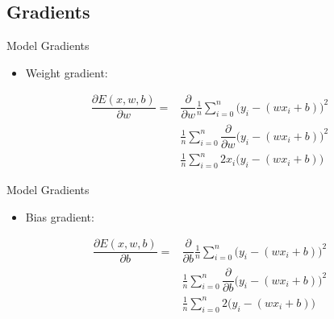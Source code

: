 \documentclass[xcolor=x11names,compress]{beamer}
\renewcommand{\(}{\begin{columns}}
\renewcommand{\)}{\end{columns}}
\newcommand{\<}[1]{\begin{column}{#1}}
\renewcommand{\>}{\end{column}}
\begin{document}
\subsection{Gradients}
\begin{frame}{Model Gradients}
	\begin{itemize}
		\item Weight gradient:
	\end{itemize}
	\begin{align*}
	\dfrac{\partial E(x,w,b)}{\partial w} =& \dfrac{\partial}{\partial w} \frac{1}{n}\sum_{i = 0}^n \Big(y_i - (wx_i + b)\Big)^2\\
	& \frac{1}{n}\sum_{i = 0}^n \dfrac{\partial}{\partial w}\Big(y_i - (wx_i + b)\Big)^2\\
	& \frac{1}{n}\sum_{i = 0}^n 2x_i \Big(y_i - (wx_i + b)\Big)
	\end{align*}
\end{frame}

\begin{frame}{Model Gradients}
	\begin{itemize}
		\item Bias gradient:
	\end{itemize}
	\begin{align*}
	\dfrac{\partial E(x,w,b)}{\partial b} =& \dfrac{\partial}{\partial b} \frac{1}{n}\sum_{i = 0}^n \Big(y_i - (wx_i + b)\Big)^2\\
	& \frac{1}{n}\sum_{i = 0}^n \dfrac{\partial}{\partial b}\Big(y_i - (wx_i + b)\Big)^2\\
	& \frac{1}{n}\sum_{i = 0}^n 2 \Big(y_i - (wx_i + b)\Big)
	\end{align*}
\end{frame}

\end{document}
